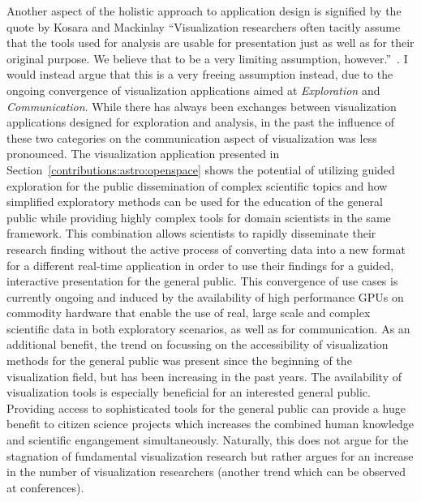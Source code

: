 Another aspect of the holistic approach to application design is signified by the quote by Kosara and Mackinlay ``Visualization researchers often tacitly assume that the tools used for analysis are usable for presentation just as well as for their original purpose. We believe that to be a very limiting assumption, however.''~\cite{kosara2013storytelling}.  I would instead argue that this is a very freeing assumption instead, due to the ongoing convergence of visualization applications aimed at \emph{Exploration} and \emph{Communication}.  While there has always been exchanges between visualization applications designed for exploration and analysis, in the past the influence of these two categories on the communication aspect of visualization was less pronounced.  The visualization application presented in Section~\ref{contributions:astro:openspace} shows the potential of utilizing guided exploration for the public dissemination of complex scientific topics and how simplified exploratory methods can be used for the education of the general public while providing highly complex tools for domain scientists in the same framework.  This combination allows scientists to rapidly disseminate their research finding without the active process of converting data into a new format for a different real-time application in order to use their findings for a guided, interactive presentation for the general public.  This convergence of use cases is currently ongoing and induced by the availability of high performance GPUs on commodity hardware that enable the use of real, large scale and complex scientific data in both exploratory scenarios, as well as for communication.  As an additional benefit, the trend on focussing on the accessibility of visualization methods for the general public was present since the beginning of the visualization field, but has been increasing in the past years.  The availability of visualization tools is especially beneficial for an interested general public.  Providing access to sophisticated tools for the general public can provide a huge benefit to citizen science projects which increases the combined human knowledge and scientific engangement simultaneously.  Naturally, this does not argue for the stagnation of fundamental visualization research but rather argues for an increase in the number of visualization researchers (another trend which can be observed at conferences).

